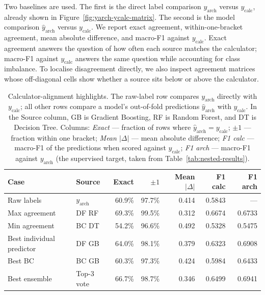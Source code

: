 \documentclass{article}
\begin{document}
Two baselines are used. The first is the direct label comparison \(y_{\text{arch}}\) versus \(y_{\text{calc}}\), already shown in Figure~\ref{fig:yarch-ycalc-matrix}. The second is the model comparison \(\hat{y}_{\text{arch}}\) versus \(y_{\text{calc}}\). We report exact agreement, within-one-bracket agreement, mean absolute difference, and macro-F1 against \(y_{\text{calc}}\). Exact agreement answers the question of how often each source matches the calculator; macro-F1 against \(y_{\text{calc}}\) answers the same question while accounting for class imbalance. To localise disagreement directly, we also inspect agreement matrices whose off-diagonal cells show whether a source sits below or above the calculator.

\begin{table}[h]
\centering
\caption{Calculator-alignment highlights. The raw-label row compares \(y_{\text{arch}}\) directly with \(y_{\text{calc}}\); all other rows compare a model's out-of-fold predictions \(\hat{y}_{\text{arch}}\) with \(y_{\text{calc}}\). In the Source column, GB is Gradient Boosting, RF is Random Forest, and DT is Decision Tree. Columns: \textit{Exact} --- fraction of rows where \(\hat{y}_{\text{arch}} = y_{\text{calc}}\); \(\pm 1\) --- fraction within one bracket; \textit{Mean $|\Delta|$} --- mean absolute difference; \textit{F1 calc} --- macro-F1 of the predictions when scored against \(y_{\text{calc}}\); \textit{F1 arch} --- macro-F1 against \(y_{\text{arch}}\) (the supervised target, taken from Table~\ref{tab:nested-results}).}
\label{tab:calc-alignment}
\footnotesize
\setlength{\tabcolsep}{3pt}
\begin{tabular*}{\textwidth}{@{\extracolsep{\fill}}llrrrrr@{}}
\toprule
Case & Source & Exact & $\pm 1$ & Mean $|\Delta|$ & F1 calc & F1 arch \\
\midrule
Raw labels & \(y_{\text{arch}}\) & 60.9\% & 97.7\% & 0.414 & 0.5843 & --- \\
Max agreement & DF RF & 69.3\% & 99.5\% & 0.312 & 0.6674 & 0.6733 \\
Min agreement & BC DT & 54.2\% & 96.6\% & 0.492 & 0.5328 & 0.5475 \\
Best individual predictor & DF GB & 64.0\% & 98.1\% & 0.379 & 0.6323 & 0.6908 \\
Best BC & BC GB & 60.3\% & 97.3\% & 0.424 & 0.5984 & 0.6433 \\
Best ensemble & Top-3 vote & 66.7\% & 98.7\% & 0.346 & 0.6499 & 0.6941 \\
\bottomrule
\end{tabular*}
\end{table}
\end{document}
